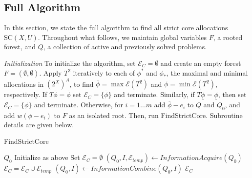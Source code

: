 \documentclass[11pt,reqno]{amsart}
\theoremstyle{definition}
\numberwithin{equation}{section}
\newcommand{\ol}{\overline}
\newcommand{\ul}{\underline}
\newcommand{\pre}{\phi}
\newcommand{\prealloc}{(2^X)^A}
\newcommand{\strcore}{\mathrm{SC}(X,U)}
\newcommand{\fix}{\mathcal{E}}
\newcommand{\toppre}{\ol{\pre}}
\newcommand{\bopre}{\ul{\pre}}
\newcommand{\acto}{Q_0}
\newcommand{\act}{Q}
\newcommand{\coll}{I}
\newcommand{\forest}{F}
\newcommand{\fixfind}{\mathcal{E}_C}
\newcommand{\fixtemp}{\mathcal{E}_{temp}}
\begin{document}
\subsection{Full Algorithm} \label{fullalgo}
In this section, we state the full algorithm to find all strict core allocations $\strcore$. 
Throughout what follows, we maintain global variables $\forest$, a rooted forest, and $\act$, a collection of active and previously solved problems.

\emph{Initialization} To initialize the algorithm, set $\fixfind = \emptyset$ and create an empty forest $F = (\emptyset,\emptyset)$. 
Apply $T^2$ iteratively to each of $\pre^*$ and $\pre_*$, the maximal and minimal allocations in $\prealloc$, to find $\toppre = \max \fix(T^2)$ and $\ul{\pre} = \min \fix(T^2)$, respectively.
If $T\toppre = \toppre$ set $\fixfind = \{\toppre\}$ and terminate.
Similarly, if $T\bopre = \bopre$, then set $\fixfind = \{\bopre\}$ and terminate. 
Otherwise, for $i = 1 \hdots m$ add $\toppre - e_i$ to $\act$ and $\acto$, and add $w(\pre - e_i)$ to $F$ as an isolated root. Then, run FindStrictCore. 
Subroutine details are given below.

\begin{algorithm} 
\caption{FindStrictCore} 
\label{alg:main}
\begin{algorithmic}[1]
\REQUIRE $\acto$
    \STATE Initialize as above
    \STATE Set $\fixfind = \emptyset$
    \WHILE{$\acto \not = \emptyset$} \label{alg3:while1}
        \STATE $(\acto, \coll, \fixtemp) \leftarrow InformationAcquire(\acto)$ 
        \STATE $\fixfind = \fixfind \cup \fixtemp$
        \WHILE{$\coll \not = \emptyset$} \label{alg3:while2}
            \STATE $(\acto,\coll) \leftarrow InformationCombine(\acto,\coll)$ 
        \ENDWHILE
    \ENDWHILE
\RETURN $\fixfind$
\end{algorithmic}
\end{algorithm}

\end{document}
